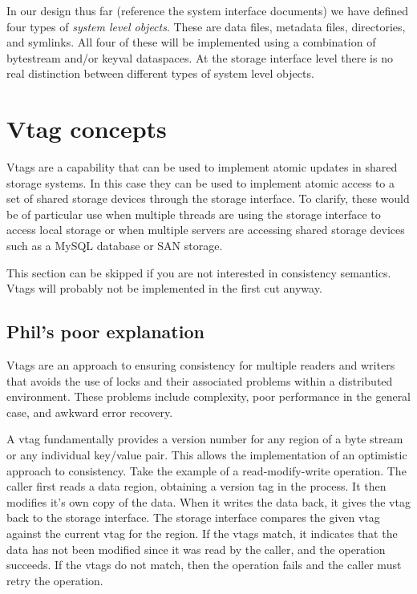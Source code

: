\documentclass[10pt]{article} %
\begin{document}
In our design thus far (reference the system interface documents) we have
defined four types of \emph{system level objects}.  These are data files,
metadata files, directories, and symlinks.  All four of these will be
implemented using a combination of bytestream and/or keyval dataspaces.
At the storage interface level there is no real distinction between
different types of system level objects.

%
%
\section{Vtag concepts}

Vtags are a capability that can be used to implement atomic updates in
shared storage systems.  In this case they can be used to implement
atomic access to a set of shared storage devices through the storage
interface.  To clarify, these would be of particular use when multiple
threads are using the storage interface to access local storage or when
multiple servers are accessing shared storage devices such as a MySQL
database or SAN storage.

This section can be skipped if you are not interested in consistency
semantics.  Vtags will probably not be implemented in the first cut
anyway.

\subsection{Phil's poor explanation}

Vtags are an approach to ensuring consistency for multiple readers
and writers that avoids the use of locks and their associated problems
within a distributed environment.  These problems include complexity,
poor performance in the general case, and awkward error recovery.


A vtag fundamentally provides a version number for any region of a byte
stream or any individual key/value pair.  This allows the implementation
of an optimistic approach to consistency.  Take the example of a
read-modify-write operation.  The caller first reads a data region,
obtaining a version tag in the process.  It then modifies it's own copy
of the data.  When it writes the data back, it gives the vtag back to
the storage interface.  The storage interface compares the given vtag against
the current vtag for the region.  If the vtags match, it indicates that
the data has not been modified since it was read by the caller, and the
operation succeeds.  If the vtags do not match, then the operation fails
and the caller must retry the operation.
\end{document}
